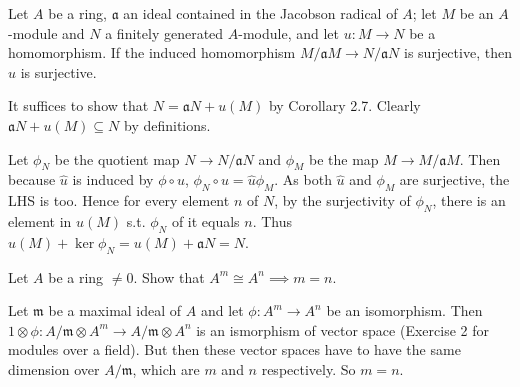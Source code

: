 \documentclass[a4paper]{exam}
\newif\ifhint
\begin{document}
\begin{questions}
	\question Let $A$ be a ring, $\mathfrak{a}$ an ideal contained in the Jacobson radical of $A $; let $M$ be an $A$-module and $N$ a finitely generated $A$-module, and let $u: M\to N$ be a homomorphism. If the induced homomorphism $M / \mathfrak{a}M \to N / \mathfrak{a}N$ is surjective, then $u$ is surjective.
	\begin{solution}
		It suffices to show that $N = \mathfrak{a}N + u(M)$ by Corollary 2.7.
		Clearly $\mathfrak{a}N + u(M) \subseteq N$ by definitions.

		Let $\phi_N$ be the quotient map $N\to N / \mathfrak{a}N$ and $\phi_M$ be the map $M \to M / \mathfrak{a}M$.
		Then because $\hat{u}$ is induced by $\phi \circ u $, $\phi_N \circ u = \hat{u}\phi_M$.
		As both $\hat{u}$ and $\phi _M$ are surjective, the LHS is too.
		Hence for every element $n$ of $N $, by the surjectivity of $\phi_N $, there is an element in $u(M)$ s.t. $\phi _N$ of it equals $n$.
		Thus $u(M) + \ker \phi _N = u(M) + \mathfrak{a}N = N$.
	\end{solution}

	\question Let $A$ be a ring $\ne 0$. Show that $A^m \cong A^n \implies m = n$.
	\ifhint
		Let $\mathfrak{m}$ be a maximal ideal of $A$ and let $\phi : A^m \to A^n$ be an isomorphism.
		Then $1 \otimes \phi: A / \mathfrak{m} \otimes A^m \to A / \mathfrak{m} \otimes A^n$ is an ismorphism of vector space of dimensions $m$ and $n$ over the field $k= A / \mathfrak{m}$.
		Hece $m=n$. [Cf. Chapter 3, Exercise 15]
	\fi
	\begin{solution}
		Let $\mathfrak{m}$ be a maximal ideal of $A$ and let $\phi : A^m \to A^n$ be an isomorphism.
		Then $1 \otimes \phi: A / \mathfrak{m} \otimes A^m \to A / \mathfrak{m} \otimes A^n$ is an ismorphism of vector space (Exercise 2 for modules over a field).
		But then these vector spaces have to have the same dimension over $A / \mathfrak{m} $, which are $m$ and $n$ respectively.
		So $m=n$.
	\end{solution}
\end{questions}
\end{document}
